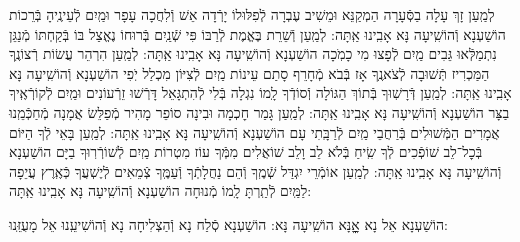 \documentclass[twoside, openany, parskip=half, 11pt]{book}
\begin{document}
\begin{sometimes}
\begin{small}
לְמַֽעַן זָךְ עָלָה בַסְּֿעָרָה הַמְקַנֵּא וּמֵשִׁיב עֶבְרָה
 לְֿפִלּוּלוֹ יָרְֿדָה אֵשׁ וְֿלִחֲכָה עָפָר וּמַֽיִם לְֿעֵינֶֽיהָ בְּֿרֵכוֹת הוֹשַׁעְנָא וְֿהוֹשִֽׁיעָה נָּא אָבִֽינוּ אַֽתָּה:
לְמַֽעַן וְֿשֵׁרֵת בֶּאֱמֶת לְֿרַבּוֹ פִּי שְֿׁנַֽיִם בְּֿרוּחוֹ נֶאֱצַל בּוֹ
 בְּֿקַחְתּוֹ מְֿנַגֵּן נִתְמַלְּֿאוּ גֵּבִים מַֽיִם לְֿפָצוּ מִי כָמֹֽכָה הוֹשַׁעְנָא וְֿהוֹשִֽׁיעָה נָּא אָבִֽינוּ אַֽתָּה:
לְמַֽעַן הִרְהֵר עֲשׂוֹת רְֿצוֹנֶֽךָ הַמַּכְרִיז תְּֿשׁוּבָה לְֿצֹאנֶֽךָ
 אָז בְּֿבֹא מְֿחָרֵף סָתַם עֵינוֹת מַֽיִם לְֿצִיּוֹן מִכְלַל יֹֽפִי הוֹשַׁעְנָא וְֿהוֹשִֽׁיעָה נָּא אָבִֽינוּ אַֽתָּה:
לְמַֽעַן דְּֿרָשֽׁוּךָ בְּֿתוֹךְ הַגּוֹלָה וְֿסוֹדְֿךָ לָֽמוֹ נִגְלָה
 בְּֿלִי לְֿהִתְגָּאֵל דָּרְֿשׁוּ זֵרְֿעוֹנִים וּמַֽיִם לְֿקוֹרְֿאֶֽיךָ בַצָּר הוֹשַׁעְנָא וְֿהוֹשִֽׁיעָה נָּא אָבִֽינוּ אַֽתָּה:
לְמַֽעַן גָּמַר חׇכְמָה וּבִינָה סוֹפֵר מָהִיר מְֿפַלֵּשׂ אֲמָנָה
 מְֿחַכְּֿמֵֽנוּ אֲמָרִים הַמְּֿשׁוּלִים בְּֿרַחֲבֵי מַֽיִם לְֿרַבָּֽתִי עָם הוֹשַׁעְנָא וְֿהוֹשִֽׁיעָה נָּא אָבִֽינוּ אַֽתָּה:
לְמַֽעַן בָּאֵי לְֿךָ הַיּוֹם בְּֿכׇל־לֵב שׁוֹפְֿכִים לְֿךָ שִֽׂיחַ בְּֿלֹא לֵב וָלֵב
 שׁוֹאֲלִים מִמְּֿךָ עוֹז מִטְרוֹת מַֽיִם לְֿשׁוֹרְֿרֽוּךָ בַיָּם הוֹשַׁעְנָא וְֿהוֹשִֽׁיעָה נָּא אָבִֽינוּ אַֽתָּה:
לְמַֽעַן אוֹמְֿרֵי יִגְדַּל שְֿׁמֶֽךָ וְֿהֵם נַחֲלָתְֿךָ וְֿעַמֶּֽךָ
 צְֿמֵאִים לְֿיֶשְׁעֲךָ כְּֿאֶֽרֶץ עֲיֵפָה לַמַּֽיִם לְֿתַֽרְתָּ לָֽמוֹ מְֿנוּחָה הוֹשַׁעְנָא וְֿהוֹשִֽׁיעָה נָּא אָבִֽינוּ אַֽתָּה:

\end{small}

\begin{large}
\shatzvkahal
 הוֹשַׁעְנָא אֵל נָא אׇׇׇׇָנָּא הוֹשִֽׁיעָה נָּא:
הוֹשַׁעְנָא סְֿלַח נָא וְֿהַצְלִיחָה נָא וְֿהוֹשִׁיעֵֽנוּ אֵל מָעֻזֵּֽנוּ:

\end{large}


\end{sometimes}
\end{document}
